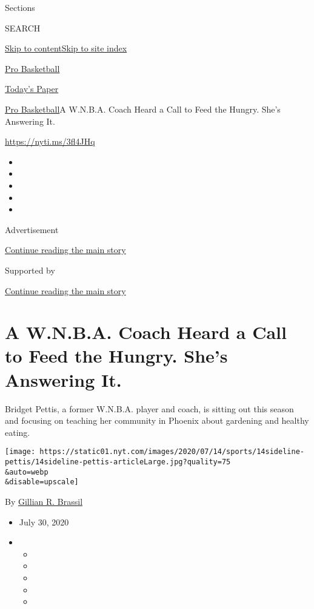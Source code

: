 Sections

SEARCH

\protect\hyperlink{site-content}{Skip to
content}\protect\hyperlink{site-index}{Skip to site index}

\href{https://www.nytimes.com/section/sports/basketball}{Pro Basketball}

\href{https://myaccount.nytimes.com/auth/login?response_type=cookie\&client_id=vi}{}

\href{https://www.nytimes.com/section/todayspaper}{Today's Paper}

\href{/section/sports/basketball}{Pro Basketball}\textbar{}A W.N.B.A.
Coach Heard a Call to Feed the Hungry. She's Answering It.

\url{https://nyti.ms/3fl4JHq}

\begin{itemize}
\item
\item
\item
\item
\item
\end{itemize}

Advertisement

\protect\hyperlink{after-top}{Continue reading the main story}

Supported by

\protect\hyperlink{after-sponsor}{Continue reading the main story}

\hypertarget{a-wnba-coach-heard-a-call-to-feed-the-hungry-shes-answering-it}{%
\section{A W.N.B.A. Coach Heard a Call to Feed the Hungry. She's
Answering
It.}\label{a-wnba-coach-heard-a-call-to-feed-the-hungry-shes-answering-it}}

Bridget Pettis, a former W.N.B.A. player and coach, is sitting out this
season and focusing on teaching her community in Phoenix about gardening
and healthy eating.

\texttt{[image: https://static01.nyt.com/images/2020/07/14/sports/14sideline-pettis/14sideline-pettis-articleLarge.jpg?quality=75\\\&auto=webp\\\&disable=upscale]}

By \href{https://www.nytimes.com/by/gillian-r--brassil}{Gillian R.
Brassil}

\begin{itemize}
\item
  July 30, 2020
\item
  \begin{itemize}
  \item
  \item
  \item
  \item
  \item
  \end{itemize}
\end{itemize}

